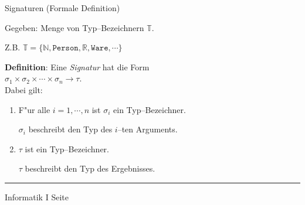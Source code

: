 \begin{slide}{}
\normalsize
\begin{center}
Signaturen (Formale Definition)
\end{center}
\vspace{0.5cm}

\footnotesize
Gegeben: Menge von Typ--Bezeichnern $\mathbb{T}$.

Z.B. \quad $\mathbb{T} = \{ \mathbb{N}, \mathtt{Person}, \mathbb{R}, \mathtt{Ware}, \cdots \}$

{\bf Definition}: Eine {\em Signatur}  hat die Form \\[0.3cm]
\hspace*{1.3cm} $\sigma_1 \times \sigma_2 \times \cdots \times \sigma_n \rightarrow \tau$. \\[0.3cm]
Dabei gilt:
\begin{enumerate}
\item F"ur alle $i=1,\cdots,n$ ist $\sigma_i$ ein Typ--Bezeichner.

      $\sigma_i$ beschreibt den Typ des $i$--ten Arguments.
\item $\tau$ ist ein Typ--Bezeichner.

      $\tau$ beschreibt den Typ des Ergebnisses.
\end{enumerate}
\begin{center}

  

\end{center}

\vspace*{\fill}
\tiny \addtocounter{mypage}{1}
\rule{15cm}{1mm}
Informatik I  \hspace*{\fill} Seite 
\end{slide}


